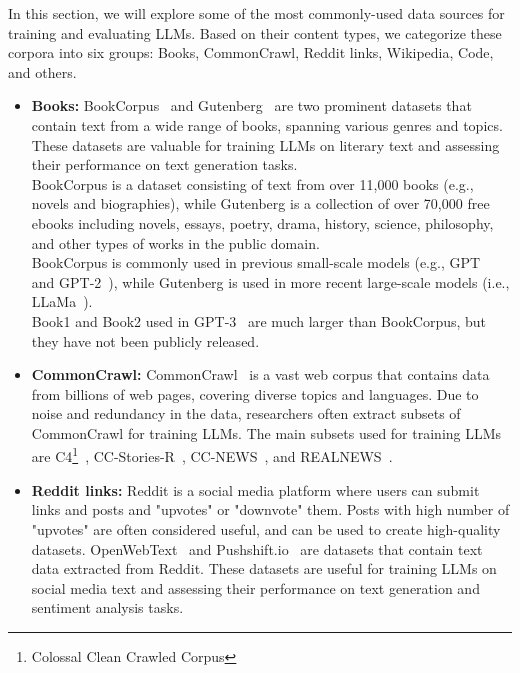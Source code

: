In this section, we will explore some of the most commonly-used data sources for training and evaluating LLMs.
Based on their content types, we categorize these corpora into six groups: Books, CommonCrawl, Reddit links, Wikipedia, Code, and others.

\begin{itemize}
	\item \textbf{Books:} {
		      BookCorpus~\cite{zhu2015aligning} and Gutenberg~\cite{projectgutenberg} are two prominent datasets that contain text from a wide range of books, spanning various genres and topics. These datasets are valuable for training LLMs on literary text and assessing their performance on text generation tasks.\\
		      BookCorpus is a dataset consisting of text from over 11,000 books (e.g., novels and biographies), while Gutenberg is a collection of over 70,000 free ebooks including novels, essays, poetry, drama, history, science, philosophy, and other types of works in the public domain.\\
		      BookCorpus is commonly used in previous small-scale models (e.g., GPT~\cite{radford2018improving} and GPT-2~\cite{radford2019language}), while Gutenberg is used in more recent large-scale models (i.e., LLaMa~\cite{touvron2023llama}).\\
		      Book1 and Book2 used in GPT-3~\cite{brown2020language} are much larger than BookCorpus, but they have not been publicly released.
	      }
	\item \textbf{CommonCrawl:} {
		      CommonCrawl~\cite{commoncrawl} is a vast web corpus that contains data from billions of web pages, covering diverse topics and languages. Due to noise and redundancy in the data, researchers often extract subsets of CommonCrawl for training LLMs. The main subsets used for training LLMs are C4\footnote{Colossal Clean Crawled Corpus}~\cite{raffel2023exploring}, CC-Stories-R~\cite{trinh2018simple}, CC-NEWS~\cite{liu2019roberta}, and REALNEWS~\cite{zellers2019defending}.\\
	      }
	\item \textbf{Reddit links:} {
		      Reddit is a social media platform where users can submit links and posts and "upvotes" or "downvote" them. Posts with high number of "upvotes" are often considered useful, and can be used to create high-quality datasets.
		      OpenWebText~\cite{gokaslan2019openwebtext} and Pushshift.io~\cite{baumgartner2020pushshift} are datasets that contain text data extracted from Reddit. These datasets are useful for training LLMs on social media text and assessing their performance on text generation and sentiment analysis tasks.
}
\end{itemize}
